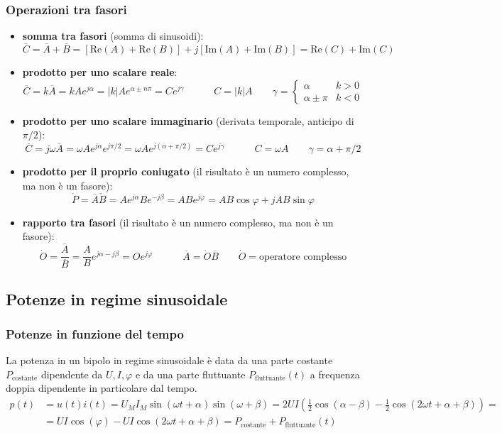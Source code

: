\documentclass[a4paper]{article}
\newcommand\Real{\text{Re}}
\newcommand\Img{\text{Im}}
\begin{document}
\subsubsection*{Operazioni tra fasori}
\begin{itemize}
	\item \textbf{somma tra fasori} (somma di sinusoidi):
	\[\overline{C} = \overline{A} + \overline{B} = [\Real(A) + \Real(B)] + j [\Img(A) + \Img(B)] = \Real(C) + \Img(C)\]
	\item \textbf{prodotto per uno scalare reale}:
	\[\overline{C} = k \overline{A} = k A e^{j\alpha} = \left|k\right| A e^{\alpha \pm n \pi} = Ce^{j\gamma}
	\qquad\quad C = \left|k\right| A \qquad \gamma = \begin{cases} \alpha & k > 0 \\ \alpha \pm \pi & k < 0 \end{cases}\]
	\item \textbf{prodotto per uno scalare immaginario} (derivata temporale, anticipo di \(\pi/2\)):
	\[\overline{C} = j\omega \overline{A} = \omega A e^{j\alpha}e^{j \pi / 2} = \omega A e^{j(\alpha + \pi/2)} = Ce^{j\gamma}
	\qquad\quad C = \omega A \qquad \gamma = \alpha + \pi/2\]
	\item \textbf{prodotto per il proprio coniugato} (il risultato è un numero complesso, ma non è un fasore):
	\[\dot{P} = \overline{A} \check{B} = Ae^{j\alpha}Be^{-j\beta} = AB e^{j\varphi} = AB\cos\varphi + jAB\sin\varphi\]
	\item \textbf{rapporto tra fasori} (il risultato è un numero complesso, ma non è un fasore):
	\[\dot{O} = \frac{\overline{A}}{\overline{B}} = \frac{A}{B} e^{j\alpha - j\beta} = Oe^{j\varphi} \qquad\quad \overline{A} = \dot{O} \overline{B} \qquad \dot{O} = \text{operatore complesso}\]
\end{itemize}

\newpage

\subsection{Potenze in regime sinusoidale}
\subsubsection*{Potenze in funzione del tempo}
La potenza in un bipolo in regime sinusoidale è data da una parte costante \(P_\text{costante}\) dipendente da \(U, I, \varphi\)
e da una parte fluttuante \(P_\text{fluttuante}(t)\) a frequenza doppia dipendente in particolare dal tempo.
\begin{align*}
	p(t) &= u(t) i(t) = U_M I_M \sin(\omega t + \alpha) \sin (\omega + \beta) = 2UI \left(\frac{1}{2} \cos(\alpha-\beta) - \frac{1}{2} \cos(2\omega t + \alpha + \beta)\right) = \\
	&= UI \cos(\varphi) - UI \cos (2 \omega t + \alpha + \beta) = P_\text{costante} + P_\text{fluttuante}(t)
\end{align*}
\end{document}
